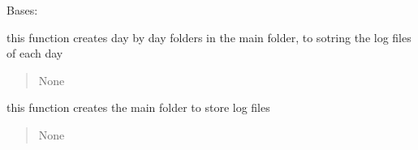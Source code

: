 \documentclass[letterpaper,10pt,english]{sphinxmanual}
\begin{document}
\begin{savenotes}\begin{fulllineitems}
\label{\detokenize{setting/backend/logging_funcs:oxin.backend.logging_funcs.app_logger}}
\pysigstartsignatures
{}
\pysigstopsignatures
\sphinxAtStartPar
Bases: 

\begin{savenotes}\begin{fulllineitems}
\label{\detokenize{setting/backend/logging_funcs:oxin.backend.logging_funcs.app_logger.create_dailyfolder}}
\pysigstartsignatures
{}
\pysigstopsignatures
\sphinxAtStartPar
this function creates day by day folders in the main folder, to sotring the log files of each day
\begin{quote}\begin{description}
\sphinxAtStartPar
None

\end{description}\end{quote}

\end{fulllineitems}\end{savenotes}


\begin{savenotes}\begin{fulllineitems}
\label{\detokenize{setting/backend/logging_funcs:oxin.backend.logging_funcs.app_logger.create_mainfolder}}
\pysigstartsignatures
{}
\pysigstopsignatures
\sphinxAtStartPar
this function creates the main folder to store log files
\begin{quote}\begin{description}
\sphinxAtStartPar
None


\end{description}
\end{quote}
\end{fulllineitems}
\end{savenotes}
\end{fulllineitems}
\end{savenotes}
\end{document}
